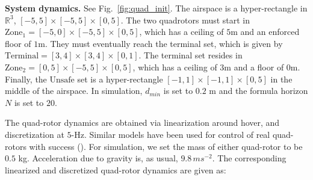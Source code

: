 \textbf{System dynamics.}
See Fig.~\ref{fig:quad_init}.
The airspace is a hyper-rectangle in $\mathbb{R}^3$, $[-5,5] \times [-5,5] \times [0,5]$.
The two quadrotors must start in $\text{Zone}_1 = [-5,0] \times [-5,5] \times [0,5]$, which has a ceiling of $5$m and an enforced floor of $1$m. 
They must eventually reach the terminal set, which is given by $\text{Terminal} = [3,4] \times [3,4] \times [0,1]$.
The terminal set resides in $\text{Zone}_2 = [0,5] \times [-5,5] \times [0,5]$, which has a ceiling of $3$m and a floor of $0$m.
Finally, the $\text{Unsafe}$ set is a hyper-rectangle $[-1,1] \times [-1,1] \times [0,5]$ in the middle of the airspace. In simulation, $d_{min}$ is set to $0.2$ m and the formula horizon $N$ is set to $20$.


The quad-rotor dynamics are obtained via linearization around hover, and discretization at $5$-Hz. Similar models have been used for control of real quad-rotors with success (\cite{PantAMNDM15_Anytime}). For simulation, we set the mass of either quad-rotor to be $0.5$ kg. Acceleration due to gravity is, as usual, $9.8\,ms^{-2}$.
The corresponding linearized and discretized quad-rotor dynamics are given as:

